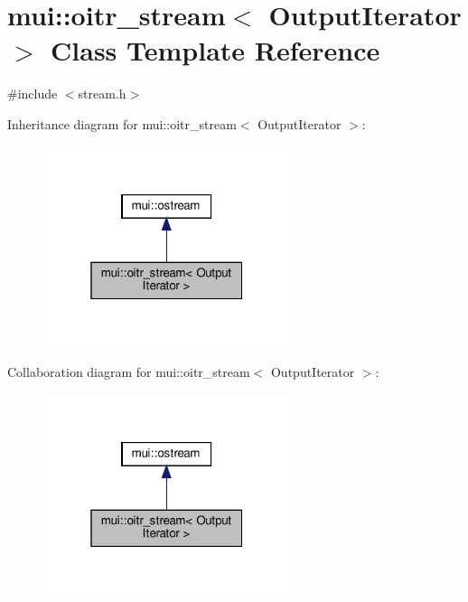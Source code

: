 \hypertarget{classmui_1_1oitr__stream}{}\section{mui\+:\+:oitr\+\_\+stream$<$ Output\+Iterator $>$ Class Template Reference}
\label{classmui_1_1oitr__stream}


{\ttfamily \#include $<$stream.\+h$>$}



Inheritance diagram for mui\+:\+:oitr\+\_\+stream$<$ Output\+Iterator $>$\+:
\nopagebreak
\begin{figure}[H]
\begin{center}
\leavevmode
\includegraphics[width=205pt]{classmui_1_1oitr__stream__inherit__graph}
\end{center}
\end{figure}


Collaboration diagram for mui\+:\+:oitr\+\_\+stream$<$ Output\+Iterator $>$\+:
\nopagebreak
\begin{figure}[H]
\begin{center}
\leavevmode
\includegraphics[width=205pt]{classmui_1_1oitr__stream__coll__graph}
\end{center}
\end{figure}
